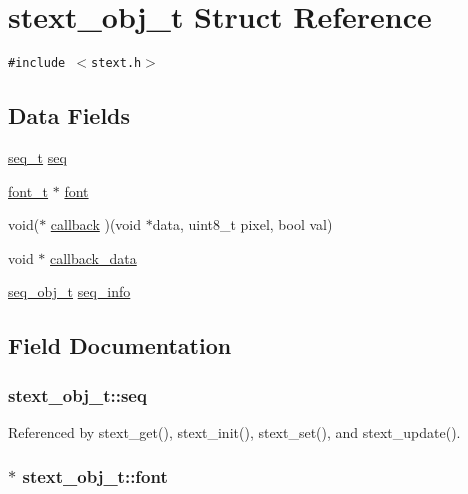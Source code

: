 \hypertarget{structstext__obj__t}{
\section{stext\_\-obj\_\-t Struct Reference}
\label{structstext__obj__t}
}
{\tt \#include $<$stext.h$>$}

\subsection*{Data Fields}
\begin{CompactItemize}
\item 
\hyperlink{structseq__obj__t}{seq\_\-t} \hyperlink{structstext__obj__t_e1759a0cda37c7884537dbb098f61ddd}{seq}
\item 
\hyperlink{structfont__t}{font\_\-t} $\ast$ \hyperlink{structstext__obj__t_057c56d15de89322a0d4eb9808b60b7c}{font}
\item 
void($\ast$ \hyperlink{structstext__obj__t_c28da1d989570019bf9072c187473c66}{callback} )(void $\ast$data, uint8\_\-t pixel, bool val)
\item 
void $\ast$ \hyperlink{structstext__obj__t_e8c5066481a3f52cf54dd91f747e736d}{callback\_\-data}
\item 
\hyperlink{structseq__obj__t}{seq\_\-obj\_\-t} \hyperlink{structstext__obj__t_04b57a99ef50849f9316b8ad9d6a5cac}{seq\_\-info}
\end{CompactItemize}


\subsection{Field Documentation}
\hypertarget{structstext__obj__t_e1759a0cda37c7884537dbb098f61ddd}{
\subsubsection{ {\bf stext\_\-obj\_\-t::seq}}}
\label{structstext__obj__t_e1759a0cda37c7884537dbb098f61ddd}




Referenced by stext\_\-get(), stext\_\-init(), stext\_\-set(), and stext\_\-update().\hypertarget{structstext__obj__t_057c56d15de89322a0d4eb9808b60b7c}{
\subsubsection{$\ast$ {\bf stext\_\-obj\_\-t::font}}}
\label{structstext__obj__t_057c56d15de89322a0d4eb9808b60b7c}





